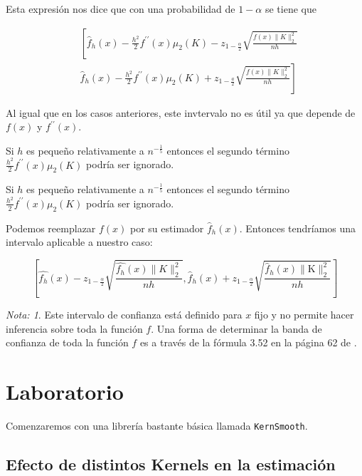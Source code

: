 \documentclass[
  12pt,
]{book}
\theoremstyle{definition}
\theoremstyle{definition}
\theoremstyle{definition}
\theoremstyle{definition}
\theoremstyle{remark}
\newtheorem*{remark}{Nota: }
\begin{document}
Esta expresión nos dice que con una probabilidad de \(1-\alpha\) se tiene
que

\begin{equation*}
\begin{aligned}
& \left[\hat{f}_{h}(x)-\frac{h^{2}}{2} f^{\prime \prime}(x) \mu_{2}(K)-z_{1-\frac{\alpha}{2}} \sqrt{\frac{f(x)\|K\|_{2}^{2}}{n h}}\right. \\
& \left.\widehat{f}_{h}(x)-\frac{h^{2}}{2} f^{\prime \prime}(x) \mu_{2}(K)+z_{1-\frac{a}{2}} \sqrt{\frac{f(x)\|K\|_{2}^{2}}{n h}}\right]
\end{aligned}
\end{equation*}

Al igual que en los casos anteriores, este invtervalo no es útil ya que
depende de \(f(x)\) y \(f^{\prime\prime} (x)\).

Si \(h\) es pequeño relativamente a \(n^{-\frac{1}{5}}\) entonces el segundo
término \(\frac{h^{2}}{2} f^{\prime \prime}(x) \mu_{2}(K)\) podría ser
ignorado.

Si \(h\) es pequeño relativamente a \(n^{-\frac{1}{5}}\) entonces el segundo término \(\frac{h^{2}}{2} f^{\prime \prime}(x) \mu_{2}(K)\) podría ser ignorado.

Podemos reemplazar \(f(x)\) por su estimador \(\hat{f}_{h}(x)\). Entonces tendríamos una intervalo aplicable a nuestro caso:

\begin{equation*}
\left[\hat{f_{h}}(x)-z_{1-\frac{\alpha}{2}} \sqrt{\frac{\hat{f_{h}}(x)\|K\|_{2}^{2}}{n h}}, \hat{f}_{h}(x)+z_{1-\frac{\alpha}{2}} \sqrt{\frac{\hat{f}_{h}(x)\|\mathrm{K}\|_{2}^{2}}{n h}}\right]
\end{equation*}

\begin{remark}
Este intervalo de confianza está definido para \(x\) fijo y no permite hacer inferencia sobre toda la función \(f\). Una forma de determinar la banda de confianza de toda la función \(f\) es a través de la fórmula 3.52 en la página 62 de \autocite{HardleNonparametric2004}.
\end{remark}

\hypertarget{laboratorio}{%
\section{Laboratorio}\label{laboratorio}}

Comenzaremos con una librería bastante básica llamada
\texttt{KernSmooth}.

\hypertarget{efecto-de-distintos-kernels-en-la-estimaciuxf3n}{%
\subsection{Efecto de distintos Kernels en la estimación}\label{efecto-de-distintos-kernels-en-la-estimaciuxf3n}}
\end{document}
